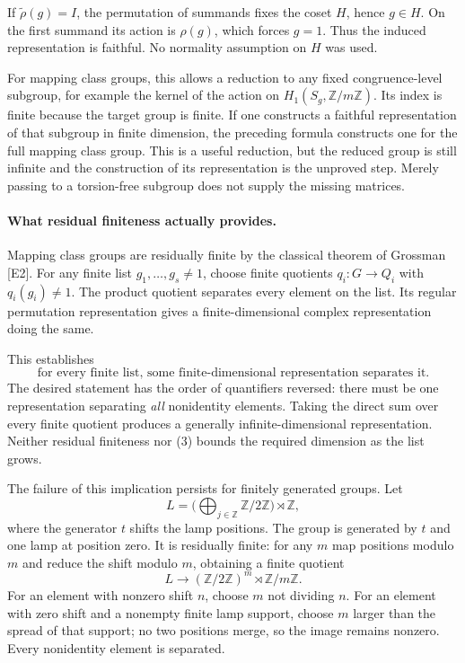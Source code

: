 \documentclass[11pt]{article}
\begin{document}
If $\widetilde\rho(g)=I$, the permutation of summands fixes the coset $H$, hence $g\in H$. On the first summand its action is $\rho(g)$, which forces $g=1$. Thus the induced representation is faithful. No normality assumption on $H$ was used.

For mapping class groups, this allows a reduction to any fixed congruence-level subgroup, for example the kernel of the action on $H_1(S_g,\mathbb Z/m\mathbb Z)$. Its index is finite because the target group is finite. If one constructs a faithful representation of that subgroup in finite dimension, the preceding formula constructs one for the full mapping class group. This is a useful reduction, but the reduced group is still infinite and the construction of its representation is the unproved step. Merely passing to a torsion-free subgroup does not supply the missing matrices.

\paragraph{What residual finiteness actually provides.}
Mapping class groups are residually finite by the classical theorem of Grossman [E2]. For any finite list $g_1,\ldots,g_s\ne1$, choose finite quotients $q_i:G\to Q_i$ with $q_i(g_i)\ne1$. The product quotient separates every element on the list. Its regular permutation representation gives a finite-dimensional complex representation doing the same.

This establishes
\[
 \text{for every finite list, some finite-dimensional representation separates it}.
                                                               \tag{3}
\]
The desired statement has the order of quantifiers reversed: there must be one representation separating \emph{all} nonidentity elements. Taking the direct sum over every finite quotient produces a generally infinite-dimensional representation. Neither residual finiteness nor (3) bounds the required dimension as the list grows.

The failure of this implication persists for finitely generated groups. Let
\[
 L=\Big(\bigoplus_{j\in\mathbb Z}\mathbb Z/2\mathbb Z\Big)\rtimes\mathbb Z,
                                                               \tag{4}
\]
where the generator $t$ shifts the lamp positions. The group is generated by $t$ and one lamp at position zero. It is residually finite: for any $m$ map positions modulo $m$ and reduce the shift modulo $m$, obtaining a finite quotient
\[
 L\longrightarrow (\mathbb Z/2\mathbb Z)^m\rtimes\mathbb Z/m\mathbb Z.
\]
For an element with nonzero shift $n$, choose $m$ not dividing $n$. For an element with zero shift and a nonempty finite lamp support, choose $m$ larger than the spread of that support; no two positions merge, so the image remains nonzero. Every nonidentity element is separated.
\end{document}
